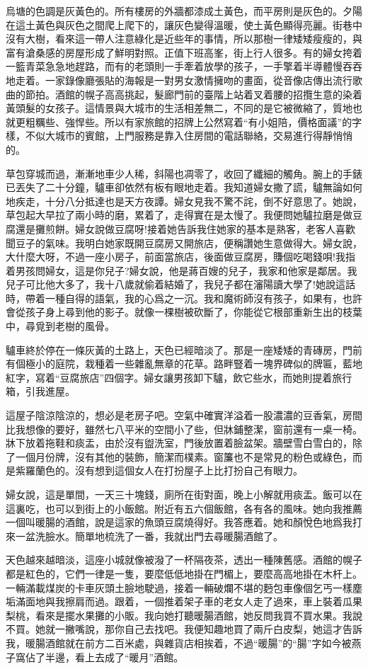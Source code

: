\documentclass[a6paper]{article}
\begin{document}
烏塘的色調是灰黃色的。所有樓房的外牆都漆成土黃色，而平房則是灰色的。夕陽在這土黃色與灰色之間爬上爬下的，讓灰色變得溫暖，使土黃色顯得亮麗。街巷中沒有大樹，看來這一帶人注意綠化是近些年的事情，所以那樹一律矮矮瘦瘦的，與富有滄桑感的房屋形成了鮮明對照。正值下班高峯，街上行人很多。有的婦女挎着一籃青菜急急地趕路，而有的老頭則一手牽着放學的孩子，一手擎着半導體慢吞吞地走着。一家錄像廳張貼的海報是一對男女激情擁吻的畫面，從音像店傳出流行歌曲的節拍。酒館的幌子高高挑起，髮廊門前的臺階上站着叉着腰的招攬生意的染着黃頭髮的女孩子。這情景與大城市的生活相差無二，不同的是它被微縮了，質地也就更粗糲些、強悍些。所以有家旅館的招牌上公然寫着“有小姐陪，價格面議”的字樣，不似大城市的賓館，上門服務是靠入住房間的電話聯絡，交易進行得靜悄悄的。

草包穿城而過，漸漸地車少人稀，斜陽也凋零了，收回了纖細的觸角。腕上的手錶已丟失了二十分鐘，驢車卻依然有板有眼地走着。我知道婦女撒了謊，驢無論如何地疾走，十分八分抵達也是天方夜譚。婦女見我不驚不詫，倒不好意思了。她說，草包起大早拉了兩小時的磨，累着了，走得實在是太慢了。我便問她驢拉磨是做豆腐還是攤煎餅。婦女說做豆腐呀!接着她告訴我住她家的基本是熟客，老客人喜歡聞豆子的氣味。我明白她家既開豆腐房又開旅店，便稱讚她生意做得大。婦女說，大什麼大呀，不過一座小房子，前面當旅店，後面做豆腐房，賺個吃喝錢唄!我指着男孩問婦女，這是你兒子?婦女說，他是蔣百嫂的兒子，我家和他家是鄰居。我兒子可比他大多了，我十八歲就偷着結婚了，我兒子都在瀋陽讀大學了!她說這話時，帶着一種自得的語氣，我的心爲之一沉。我和魔術師沒有孩子，如果有，也許會從孩子身上尋到他的影子。就像一棵樹被砍斷了，你能從它根部重新生出的枝葉中，尋覓到老樹的風骨。

驢車終於停在一條灰黃的土路上，天色已經暗淡了。那是一座矮矮的青磚房，門前有個極小的庭院，栽種着一些雜亂無章的花草。路畔豎着一塊界碑似的牌匾，藍地紅字，寫着“豆腐旅店”四個字。婦女讓男孩卸下驢，飲它些水，而她則提着旅行箱，引我進屋。

這屋子陰涼陰涼的，想必是老房子吧。空氣中確實洋溢着一股濃濃的豆香氣，房間比我想像的要好，雖然七八平米的空間小了些，但牀鋪整潔，窗前還有一桌一椅。牀下放着拖鞋和痰盂，由於沒有盥洗室，門後放置着臉盆架。牆壁雪白雪白的，除了一個月份牌，沒有其他的裝飾，簡潔而樸素。窗簾也不是常見的粉色或綠色，而是紫羅蘭色的。沒有想到這個女人在打扮屋子上比打扮自己有眼力。

婦女說，這是單間，一天三十塊錢，廁所在街對面，晚上小解就用痰盂。飯可以在這裏吃，也可以到街上的小飯館。附近有五六個飯館，各有各的風味。她向我推薦一個叫暖腸的酒館，說是這家的魚頭豆腐燒得好。我答應着。她和顏悅色地爲我打來一盆洗臉水。簡單地梳洗了一番，我就出門去尋暖腸酒館了。

天色越來越暗淡，這座小城就像被潑了一杯隔夜茶，透出一種陳舊感。酒館的幌子都是紅色的，它們一律是一隻，要麼低低地掛在門楣上，要麼高高地掛在木杆上。一輛滿載煤炭的卡車灰頭土臉地駛過，接着一輛破爛不堪的麪包車像個乞丐一樣塵垢滿面地與我擦肩而過。跟着，一個推着架子車的老女人走了過來，車上裝着瓜果梨桃，看來是擺水果攤的小販。我向她打聽暖腸酒館，她反問我買不買水果。我說不買。她就一撇嘴說，那你自己去找吧。我便知趣地買了兩斤白皮梨，她這才告訴我，暖腸酒館就在前方二百米處，與雜貨店相挨着，不過“暖腸”的“腸”字如今被燕子窩佔了半邊，看上去成了“暖月”酒館。
\end{document}
